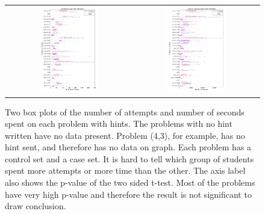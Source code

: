 \documentclass{llncs2e/llncs}
\begin{document}
\begin{figure}[ht]
  \centering
   \begin{tabular}{c c}
  \includegraphics[width=0.48\textwidth]{image/problem_tries.png} & 
  \includegraphics[width=0.48\textwidth]{image/problem_time.png}
  \end{tabular}
  \caption{Two box plots of the number of attempts and number of seconds spent on each problem with hints. The problems with no hint written have no data present. Problem (4,3), for example, has no hint sent, and therefore has no data on graph. Each problem has a control set and a case set. It is hard to tell which group of students spent more attempts or more time than the other. The axis label also shows the p-value of the two sided t-test. Most of the problems have very high p-value and therefore the result is not significant to draw conclusion.}
   \label{fig:tries_analysis}
\end{figure}
\end{document}

